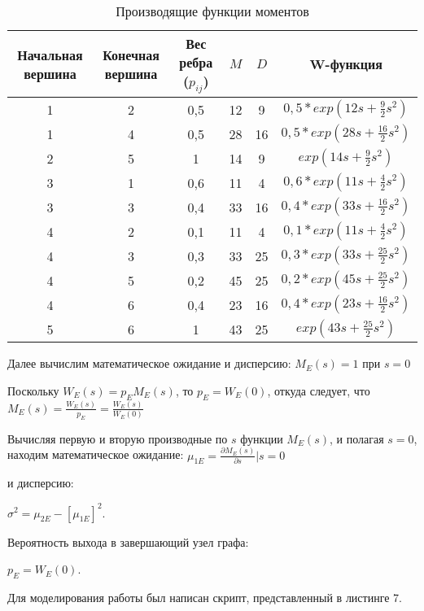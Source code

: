 \begin{table}[htb]
\centering
	\begin{tabular}{|c|c|c|c|c|c|}
	\hline 
	Начальная вершина & Конечная вершина & Вес ребра ($p_{ij}$) & $M$ & $D$ & W-функция \\ 
	\hline 
	1 & 2 & 0,5 & 12 & 9 & $0,5*exp(12s+\frac{9}{2}s^2)$ \\ 
	\hline 
	1 & 4 & 0,5 & 28 & 16 & $0,5*exp(28s+\frac{16}{2}s^2)$ \\ 
	\hline 
	2 & 5 & 1 & 14 & 9 & $exp(14s+\frac{9}{2}s^2)$ \\ 
	\hline 
	3 & 1 & 0,6 & 11 & 4 & $0,6*exp(11s+\frac{4}{2}s^2)$ \\ 
	\hline 
	3 & 3 & 0,4 & 33 & 16 & $0,4*exp(33s+\frac{16}{2}s^2)$ \\ 
	\hline 
	4 & 2 & 0,1 & 11 & 4 & $0,1*exp(11s+\frac{4}{2}s^2)$ \\ 
	\hline 
	4 & 3 & 0,3 & 33 & 25 & $0,3*exp(33s+\frac{25}{2}s^2)$ \\ 
	\hline 
	4 & 5 & 0,2 & 45 & 25 & $0,2*exp(45s+\frac{25}{2}s^2)$ \\ 
	\hline 
	4 & 6 & 0,4 & 23 & 16 & $0,4*exp(23s+\frac{16}{2}s^2)$ \\ 
	\hline 
	5 & 6 & 1 & 43 & 25 & $exp(43s+\frac{25}{2}s^2)$ \\ 
	\hline 
	\end{tabular} 
\caption{Производящие функции моментов}
\end{table}

Далее вычислим математическое ожидание и дисперсию: $M_E(s) = 1$ при $s=0$

Поскольку $W_E(s)=p_E M_E (s)$,  то  $p_E=W_E(0)$,  откуда следует, что $M_E(s)=\frac{W_E(s)}{p_E} =\frac{W_E(s)}{W_E(0)}$

Вычисляя первую и вторую производные по $s$ функции $M_E(s)$, и полагая $s=0$, находим математическое ожидание:
$\mu_{1E}=\frac{\partial M_E(s)}{\partial s}|s=0$

и дисперсию:

$\sigma^2=\mu_{2E}-[\mu_{1E}]^2$.

Вероятность выхода в завершающий узел графа:

$p_E=W_E (0)$.

Для моделирования работы был написан скрипт, представленный в листинге 7.



\newpage

